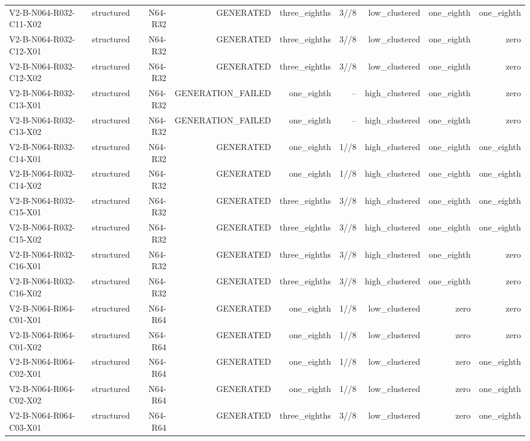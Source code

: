 {\begin{longtable}{lrrrrrrrr}
V2-B-N064-R032-C11-X02 & structured & N64-R32 & GENERATED & three\_eighths & 3//8 & low\_clustered & one\_eighth & one\_eighth \\
V2-B-N064-R032-C12-X01 & structured & N64-R32 & GENERATED & three\_eighths & 3//8 & low\_clustered & one\_eighth & zero \\
V2-B-N064-R032-C12-X02 & structured & N64-R32 & GENERATED & three\_eighths & 3//8 & low\_clustered & one\_eighth & zero \\
V2-B-N064-R032-C13-X01 & structured & N64-R32 & GENERATION\_FAILED & one\_eighth & -- & high\_clustered & one\_eighth & zero \\
V2-B-N064-R032-C13-X02 & structured & N64-R32 & GENERATION\_FAILED & one\_eighth & -- & high\_clustered & one\_eighth & zero \\
V2-B-N064-R032-C14-X01 & structured & N64-R32 & GENERATED & one\_eighth & 1//8 & high\_clustered & one\_eighth & one\_eighth \\
V2-B-N064-R032-C14-X02 & structured & N64-R32 & GENERATED & one\_eighth & 1//8 & high\_clustered & one\_eighth & one\_eighth \\
V2-B-N064-R032-C15-X01 & structured & N64-R32 & GENERATED & three\_eighths & 3//8 & high\_clustered & one\_eighth & one\_eighth \\
V2-B-N064-R032-C15-X02 & structured & N64-R32 & GENERATED & three\_eighths & 3//8 & high\_clustered & one\_eighth & one\_eighth \\
V2-B-N064-R032-C16-X01 & structured & N64-R32 & GENERATED & three\_eighths & 3//8 & high\_clustered & one\_eighth & zero \\
V2-B-N064-R032-C16-X02 & structured & N64-R32 & GENERATED & three\_eighths & 3//8 & high\_clustered & one\_eighth & zero \\
V2-B-N064-R064-C01-X01 & structured & N64-R64 & GENERATED & one\_eighth & 1//8 & low\_clustered & zero & zero \\
V2-B-N064-R064-C01-X02 & structured & N64-R64 & GENERATED & one\_eighth & 1//8 & low\_clustered & zero & zero \\
V2-B-N064-R064-C02-X01 & structured & N64-R64 & GENERATED & one\_eighth & 1//8 & low\_clustered & zero & one\_eighth \\
V2-B-N064-R064-C02-X02 & structured & N64-R64 & GENERATED & one\_eighth & 1//8 & low\_clustered & zero & one\_eighth \\
V2-B-N064-R064-C03-X01 & structured & N64-R64 & GENERATED & three\_eighths & 3//8 & low\_clustered & zero & one\_eighth \\

\end{longtable}}
